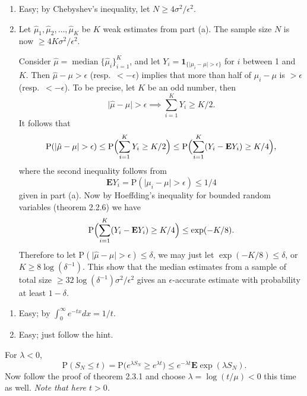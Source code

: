 \documentclass[11pt]{article}
\newcommand{\abs}[1]{\lvert #1 \rvert}
\renewcommand{\Pr}{\mathrm{P}}
\newcommand{\E}{\mathbf{E}}
\newcommand{\I}[1]{\mathbf{1}_{\{#1\}}}
\theoremstyle{plain}
\theoremstyle{definition}
\theoremstyle{remark}
\theoremstyle{definition}
\newenvironment{mansol}[1]{%
  \renewcommand\themansolinner{#1}%
  \mansolinner
}{\endmansolinner}
\begin{document}
\begin{mansol}{2.2.9}
\begin{enumerate}[label=(\alph*)]
    \item Easy; by Chebyshev's inequality, let $N \geq 4 \sigma^2 / \epsilon^2$.
    \item Let $\hat{\mu}_1,\hat{\mu}_2,\ldots,\hat{\mu}_K$ be $K$ weak estimates from part (a). The sample size $N$ is now $\geq 4K \sigma^2/\epsilon^2$.

    Consider $\hat \mu = \operatorname{median}\{\hat \mu_i\}_{i=1}^K$, and let $Y_i = \I{\abs{\mu_i - \mu} > \epsilon}$ for $i$ between 1 and $K$. Then $\hat \mu - \mu > \epsilon$ (resp.\ $< -\epsilon$) implies that more than half of $\mu_i - \mu$ is $> \epsilon$ (resp.\ $< -\epsilon$). To be precise, let $K$ be an odd number, then \[\abs{\hat\mu - \mu} > \epsilon \implies \sum_{i=1}^K Y_i \geq K/2.\] It follows that \[
        \Pr(\abs{\hat \mu - \mu} > \epsilon) \leq \Pr\Bigl(\sum_{i=1}^K Y_i \geq K/2\Bigr) \leq \Pr\Bigl(\sum_{i=1}^K (Y_i - \E Y_i) \geq K/4\Bigr),
    \]
    where the second inequality follows from \[\E Y_i = \Pr(\abs{\mu_i - \mu} > \epsilon) \leq 1/4\] given in part (a). Now by Hoeffding's inequality for bounded random variables (theorem 2.2.6) we have \[
    \Pr\Bigl(\sum_{i=1}^K (Y_i - \E Y_i) \geq K/4\Bigr) \leq \exp(- K / 8).
    \]
    Therefore to let $\Pr(\abs{\hat \mu - \mu} > \epsilon) \leq \delta$, we may just let $\exp(- K / 8) \leq \delta$, or $K \geq 8 \log(\delta^{-1})$. This show that the median estimates from a sample of total size $\geq 32 \log(\delta^{-1}) \sigma^2/\epsilon^2$ gives an $\epsilon$-accurate estimate with probability at least $1-\delta$.
\end{enumerate}
\end{mansol}

\begin{mansol}{2.2.10}
\begin{enumerate}[label=(\alph*)]
\item Easy; by $\int_0^\infty e^{-tx} dx = 1/t$.
\item Easy; just follow the hint.
\end{enumerate}
\end{mansol}

\begin{mansol}{2.3.2}
For $\lambda < 0$, \[\Pr(S_N \leq t) = \Pr\bigl(e^{\lambda S_N} \geq e^{\lambda t}\bigr) \leq e^{-\lambda t} \E \exp(\lambda S_N).\]
Now follow the proof of theorem 2.3.1 and choose $\lambda = \log(t/\mu) < 0$ this time as well. \textit{Note that here $t > 0$.}
\end{mansol}
\end{document}
